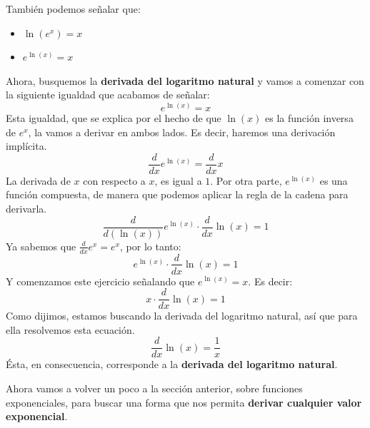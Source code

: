 \documentclass[12pt]{article}
\begin{document}
También podemos señalar que:

\begin{itemize}
\item $\ln(e^{x}) = x$
\item $e^{\ln(x)} = x$
\end{itemize}

Ahora, busquemos la \textbf{derivada del logaritmo natural} y vamos a comenzar con la siguiente igualdad que acabamos de señalar:
\[e^{\ln(x)} = x\]
Esta igualdad, que se explica por el hecho de que $\ln(x)$ es la función inversa de $e^{x}$, la vamos a derivar en ambos lados. Es decir, haremos una derivación implícita.
\[\frac{d}{dx} e^{\ln(x)} = \frac{d}{dx} x\]
La derivada de $x$ con respecto a $x$, es igual a $1$. Por otra parte, $e^{\ln(x)}$ es una función compuesta, de manera que podemos aplicar la regla de la cadena para derivarla.
\[\frac{d}{d(\ln(x))} e^{\ln(x)} \cdot \frac{d}{dx} \ln(x) = 1\]
Ya sabemos que $\frac{d}{dx} e^{x} = e^{x}$, por lo tanto:
\[e^{\ln(x)} \cdot \frac{d}{dx} \ln(x) = 1\]
Y comenzamos este ejercicio señalando que $e^{\ln(x)} = x$. Es decir:
\[x \cdot \frac{d}{dx} \ln(x) = 1\]
Como dijimos, estamos buscando la derivada del logaritmo natural, así que para ella resolvemos esta ecuación.
\[\frac{d}{dx} \ln(x) = \frac{1}{x}\]
Ésta, en consecuencia, corresponde a la \textbf{derivada del logaritmo natural}.

Ahora vamos a volver un poco a la sección anterior, sobre funciones exponenciales, para buscar una forma que nos permita \textbf{derivar cualquier valor exponencial}.
\end{document}
